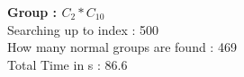 \textbf{Group : $C_2*C_{10}$}\\
Searching up to index : 500\\
How many normal groups are found : 469\\
Total Time in s : 86.6\\
